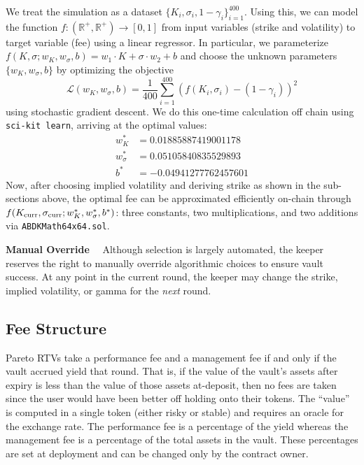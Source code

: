 \documentclass[hidelinks, 12pt]{article}
\begin{document}
We treat the simulation as a dataset $\{K_i, \sigma_i, 1 - \gamma_i\}_{i=1}^{400}$. Using this, we can model the function $f: (\mathbb{R}^+, \mathbb{R}^+) \rightarrow [0,1]$ from input variables (strike and volatility) to target variable (fee) using a linear regressor. In particular, we parameterize $f(K, \sigma; w_K, w_\sigma, b) = w_1 \cdot K + \sigma \cdot w_2 + b$ and choose the unknown parameters $\{w_K, w_\sigma, b\}$ by optimizing the objective
\begin{equation}
\mathcal{L}(w_K, w_\sigma, b) = \frac{1}{400}\sum_{i=1}^{400} \left(f(K_i, \sigma_i) - (1 - \gamma_i) \right)^2
\label{eq:loss}
\end{equation}
using stochastic gradient descent. We do this one-time calculation off chain using \texttt{sci-kit learn}, arriving at the optimal values:
\begin{align*}
w^*_K &= 0.01885887419001178 \\
w^*_\sigma &= 0.05105840835529893 \\
b^* &= -0.04941277762457601
\end{align*}
Now, after choosing implied volatility and deriving strike as shown in the sub-sections above, the optimal fee can be approximated efficiently on-chain through $f(K_{\textup{curr}}, \sigma_{\textup{curr}}; w^*_K, w^*_\sigma, b^*)$: three constants, two multiplications, and two additions via \texttt{ABDKMath64x64.sol}.

\textbf{Manual Override}$\quad$ Although selection is largely automated, the keeper reserves the right to manually override algorithmic choices to ensure vault success. At any point in the current round, the keeper may change the strike, implied volatility, or gamma for the \textit{next} round.

\subsection{Fee Structure}
\label{sec:fees}

Pareto RTVs take a performance fee and a management fee if and only if the vault accrued yield that round.
That is, if the value of the vault's assets after expiry is less than the value of those assets at-deposit, then no fees are taken since the user would have been better off holding onto their tokens.
The ``value'' is computed in a single token (either risky or stable) and requires an oracle for the exchange rate.
The performance fee is a percentage of the yield whereas the management fee is a percentage of the total assets in the vault. These percentages are set at deployment and can be changed only by the contract owner.
\end{document}
